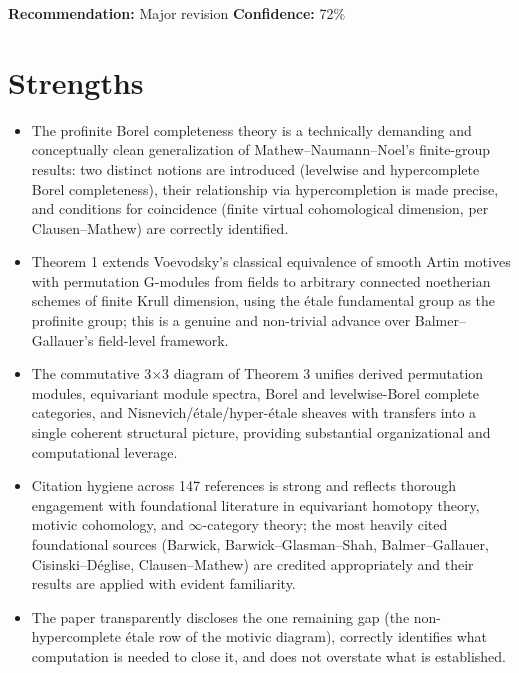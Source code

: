 \documentclass[11pt]{article}
\begin{document}
\textbf{Recommendation:} Major revision \quad \textbf{Confidence:} 72\%\\

\section*{Strengths}
\begin{itemize}[leftmargin=*]
  \item The profinite Borel completeness theory is a technically demanding and conceptually clean generalization of Mathew--Naumann--Noel's finite-group results: two distinct notions are introduced (levelwise and hypercomplete Borel completeness), their relationship via hypercompletion is made precise, and conditions for coincidence (finite virtual cohomological dimension, per Clausen--Mathew) are correctly identified.
  \item Theorem 1 extends Voevodsky's classical equivalence of smooth Artin motives with permutation G-modules from fields to arbitrary connected noetherian schemes of finite Krull dimension, using the étale fundamental group as the profinite group; this is a genuine and non-trivial advance over Balmer--Gallauer's field-level framework.
  \item The commutative 3\ensuremath{\times}3 diagram of Theorem 3 unifies derived permutation modules, equivariant module spectra, Borel and levelwise-Borel complete categories, and Nisnevich/étale/hyper-étale sheaves with transfers into a single coherent structural picture, providing substantial organizational and computational leverage.
  \item Citation hygiene across 147 references is strong and reflects thorough engagement with foundational literature in equivariant homotopy theory, motivic cohomology, and \ensuremath{\infty}-category theory; the most heavily cited foundational sources (Barwick, Barwick--Glasman--Shah, Balmer--Gallauer, Cisinski--Déglise, Clausen--Mathew) are credited appropriately and their results are applied with evident familiarity.
  \item The paper transparently discloses the one remaining gap (the non-hypercomplete étale row of the motivic diagram), correctly identifies what computation is needed to close it, and does not overstate what is established.
\end{itemize}
\end{document}
